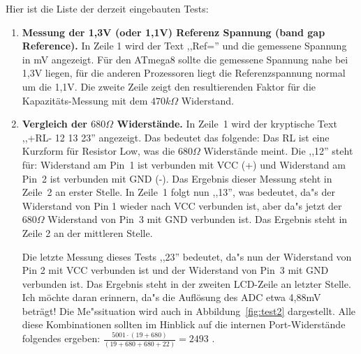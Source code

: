 \vspace{1cm}
Hier ist die Liste der derzeit eingebauten Tests:
\vspace{1cm}
\begin{enumerate}
\item {\bf Messung der 1,3V (oder 1,1V) Referenz Spannung (band gap Reference).} In Zeile 1 wird der Text ,,Ref='' und die
gemessene Spannung in mV angezeigt.
F\"ur den ATmega8 sollte die gemessene Spannung nahe bei 1,3V liegen, f\"ur die anderen Prozessoren liegt
die Referenzspannung normal um die 1,1V.
Die zweite Zeile zeigt den resultierenden Faktor f\"ur die Kapazit\"ats-Messung mit dem \(470k\Omega\) Widerstand.
\item {\bf Vergleich der \(680\Omega\) Widerst\"ande.} 
In Zeile~1 wird der kryptische Text  ,,+RL- 12 13 23'' angezeigt. Das bedeutet das folgende:
Das RL ist eine Kurzform f\"ur Resistor Low, was die \(680\Omega\) Widerst\"ande meint. Die ,,12'' steht f\"ur: 
Widerstand am Pin~1 ist verbunden mit VCC (+) und Widerstand am Pin~2 ist verbunden mit GND (-). 
Das Ergebnis dieser Messung steht in Zeile~2 an erster Stelle.
 In Zeile~1 folgt nun ,,13'', was bedeutet, da"s der Widerstand von Pin 1 wieder nach VCC verbunden ist,
aber da"s jetzt der \(680\Omega\) Widerstand von Pin~3  mit GND verbunden ist.
Das Ergebnis steht in Zeile 2 an der mittleren Stelle.

Die letzte Messung dieses Tests ,,23'' bedeutet, da"s nun der Widerstand von Pin 2 mit VCC verbunden ist und
der Widerstand von Pin~3 mit GND verbunden ist.
Das Ergebnis steht in der zweiten LCD-Zeile an letzter Stelle.
Ich m\"ochte daran erinnern, da"s die Aufl\"osung des ADC etwa 4,88mV betr\"agt!
Die Me"ssituation wird auch in Abbildung~\ref{fig:test2} dargestellt.
Alle diese Kombinationen sollten im Hinblick auf die internen Port-Widerst\"ande folgendes ergeben:
\(\frac{5001 \cdot  (19+680)}{ (19+680+680+22)} = 2493\) .


\end{enumerate}
